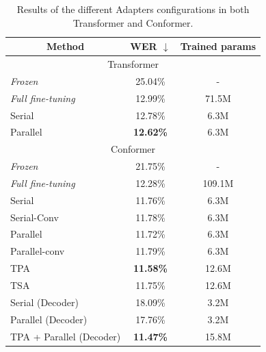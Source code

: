\begin{table}[t]
\caption{Results of the different Adapters configurations in both Transformer and Conformer.}
\begin{center}    
\begin{tabular}{ccc}
\hline
 Method & WER $\downarrow$     & Trained params    \\ \hline \hline
\multicolumn{3}{c}{Transformer} \\ \hline
\multicolumn{1}{l}{\textit{Frozen}} & 25.04\%   & - \\
\multicolumn{1}{l}{\textit{Full fine-tuning}} & 12.99\% & 71.5M \\ \hline
\multicolumn{1}{l}{Serial}  &   12.78\% & 6.3M  \\ 
\multicolumn{1}{l}{Parallel}  &     \textbf{12.62\%} & 6.3M  \\ \hline\hline
\multicolumn{3}{c}{Conformer} \\ \hline
\multicolumn{1}{l}{\textit{Frozen}} & 21.75\%   & - \\ 
\multicolumn{1}{l}{\textit{Full fine-tuning}} & 12.28\% & 109.1M \\ \hline
\multicolumn{1}{l}{Serial}  &   11.76\% & 6.3M  \\ %
\multicolumn{1}{l}{Serial-Conv} & 11.78\%     & 6.3M  \\
\multicolumn{1}{l}{Parallel}    & 11.72\% & 6.3M  \\ %
\multicolumn{1}{l}{Parallel-conv} & 11.79\%      & 6.3M  \\ %
\multicolumn{1}{l}{TPA} & \textbf{11.58\%}     & 12.6M  \\ %
\multicolumn{1}{l}{TSA} & 11.75\%     & 12.6M  \\ \hline %
\multicolumn{1}{l}{Serial (Decoder)} & 18.09\%     & 3.2M  \\ 
\multicolumn{1}{l}{Parallel (Decoder)} &17.76\%     & 3.2M  \\ \hline
\multicolumn{1}{l}{TPA + Parallel (Decoder)} & \textbf{11.47\%}     & 15.8M  \\ \hline

\end{tabular}
\end{center}

\label{tab:res_config}
\end{table}

